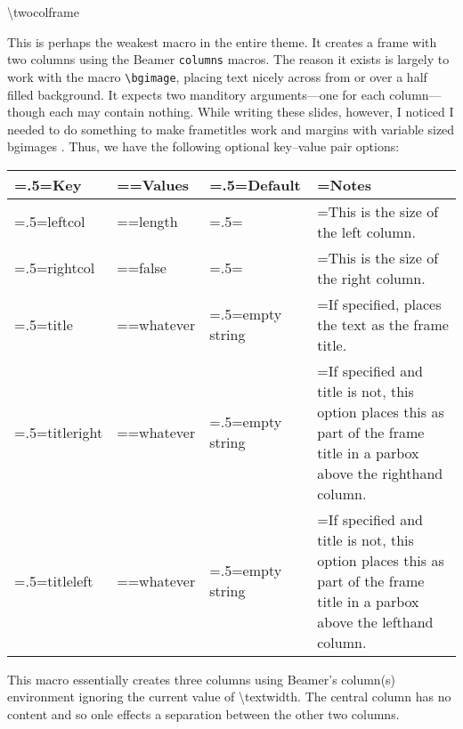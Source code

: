 \begin{frame}{\textbackslash{}twocolframe}
\Tiny
\parbox{\textwidth}{\scriptsize This is perhaps the weakest macro in the entire theme. It creates a frame with two columns using the Beamer {\tt columns} macros. The reason it exists is largely to work with the macro {\tt \textbackslash{}bgimage}, placing text nicely across from or over a half filled background. It expects two manditory arguments---one for each column---though each may contain nothing. While writing these slides, however, I noticed I needed to do something to make frametitles work and margins with variable sized bgimages . Thus, we have the following optional key--value pair options:}

\begin{tabularx}{\textwidth}{>{\hsize=.5\hsize\linewidth=\hsize}X
                                >{\hsize=\hsize\linewidth=\hsize}X
                                >{\hsize=.5\hsize\linewidth=\hsize}X
                                >{\hsize=2\hsize\linewidth=\hsize}X}
\toprule
\textbf{Key}&\textbf{Values}&\textbf{Default}&\textbf{Notes}\\
\midrule
leftcol&\textcolor{ScoutPurple}{length}&5cm&This is the size of the left column.\\
rightcol&\textcolor{ScoutPurple}{false}&5cm&This is the size of the right column.\\
title&\textcolor{ScoutPurple}{whatever}&\textcolor{ScoutPurple}{empty string}&If specified, places the text as the frame title.\\
titleright&\textcolor{ScoutPurple}{whatever}&\textcolor{ScoutPurple}{empty string}&If specified and title is not, this option places this as part of the frame title in a parbox above the righthand column.\\
titleleft&\textcolor{ScoutPurple}{whatever}&\textcolor{ScoutPurple}{empty string}&If specified and title is not, this option places this as part of the frame title in a parbox above the lefthand column.\\
\bottomrule
\end{tabularx}

\parbox{\textwidth}{\scriptsize This macro essentially creates three columns using Beamer's column(s) environment ignoring the current value of \textbackslash{}textwidth. The central column has no content and so onle effects a separation between the other two columns.}
\end{frame}

